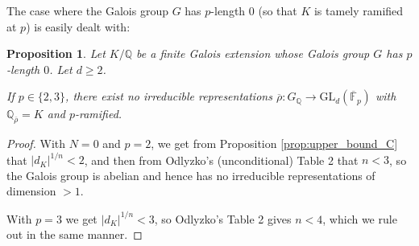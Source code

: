 \documentclass{amsart}
\newtheorem{prop}[theorem]{Proposition}
\theoremstyle{definition}
\newcommand{\lra}{\longrightarrow}
\newcommand{\Q}{\mathbb{Q}}
\newcommand{\F}{\mathbb{F}}
\newcommand{\bF}{\overline{\F}}
\newcommand{\br}{\overline{\rho}}
\newcommand{\GL}{\mathrm{GL}}
\newcommand{\UT}{\mathrm{UT}}
\renewcommand{\geq}{\geqslant}
\begin{document}
%
%
%

The case where the Galois group $G$ has $p$-length $0$ (so that $K$ is tamely ramified at $p$) is easily dealt with:
\begin{prop}\label{prop:length0}
  Let $K/\Q$ be a finite Galois extension whose Galois group $G$ has $p$-length $0$.
  Let $d\geq 2$.

  If $p\in\{2,3\}$, there exist no irreducible representations $\br:G_\Q\lra\GL_d(\bF_p)$ with $\Q_{\br}=K$ and $p$-ramified.
\end{prop}
\begin{proof}
  With $N=0$ and $p=2$, we get from Proposition \ref{prop:upper_bound_C} that $|d_K|^{1/n}<2$, and then from Odlyzko's (unconditional) Table 2 that $n<3$, so the Galois group is abelian and hence has no irreducible representations of dimension $>1$.

  With $p=3$ we get $|d_K|^{1/n}<3$, so Odlyzko's Table 2 gives $n<4$, which we rule out in the same manner.
\end{proof}
\end{document}
